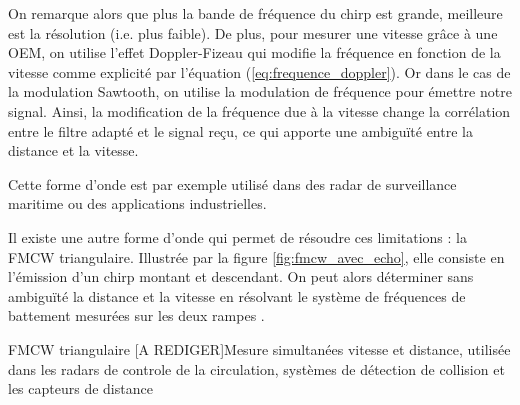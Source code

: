 On remarque alors que plus la bande de fréquence du chirp est grande, meilleure est la résolution (i.e. plus faible). De plus, pour mesurer une vitesse grâce à une OEM, on utilise l'effet Doppler-Fizeau qui modifie la fréquence en fonction de la vitesse comme explicité par l'équation (\ref{eq:frequence_doppler}). Or dans le cas de la modulation Sawtooth, on utilise la modulation de fréquence pour émettre notre signal. Ainsi, la modification de la fréquence due à la vitesse change la corrélation entre le filtre adapté et le signal reçu, ce qui apporte une ambiguïté entre la distance et la vitesse.

Cette forme d'onde est par exemple utilisé dans des radar de surveillance maritime ou des applications industrielles.

Il existe une autre forme d'onde qui permet de résoudre ces limitations : la FMCW triangulaire. Illustrée par la figure \ref{fig:fmcw_avec_echo}, elle consiste en l'émission d'un chirp montant et descendant. On peut alors déterminer sans ambiguïté la distance et la vitesse en résolvant le système de fréquences de battement mesurées sur les deux rampes \cite{richards2010}.

FMCW triangulaire
[A REDIGER]Mesure simultanées vitesse et distance, utilisée dans les radars de controle de la circulation, systèmes de détection de collision et les capteurs de distance

